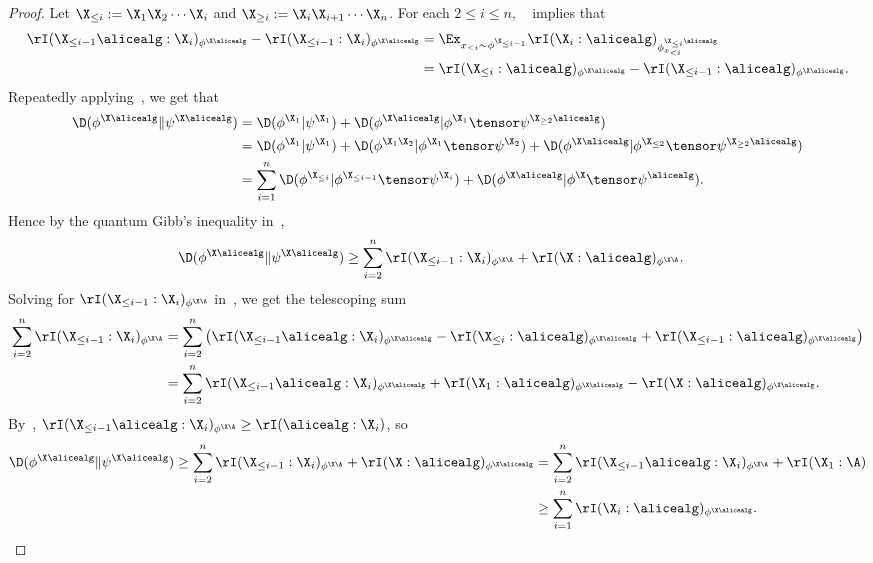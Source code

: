 \begin{proof}
	Let $\X_{\leq i} := \X_{1} \X_{2} \cdots \X_{i}$ and $\X_{\geq i} := \X_{i} \X_{i+1} \cdots \X_{n}$. For each $2 \leq i \leq n$, ~ implies that 
	\begin{align}
		\nonumber \rI(\X_{\leq i-1} \alicealg: \X_i)_{\phi^{\X \alicealg}} - \rI(\X_{ \leq i-1}: \X_i)_{\phi^{\X \alicealg}} &=  \Ex_{x_{<i} \sim \phi^{\X_{\leq i-1}}}  \rI( \X_i :\alicealg)_{\phi_{x_{<i}}^{\X_{\leq i}\alicealg}} \\
		\label{eq:raz_1a} &= \rI(\X_{\leq i} : \alicealg)_{\phi^{\X \alicealg}} - \rI(\X_{\leq i-1} : \alicealg)_{\phi^{\X \alicealg}}. 
	\end{align} 
	Repeatedly applying~, we get that
	\begin{align*}
		\D(\phi^{\X \alicealg} \| \psi^{\X \alicealg}) &= \D(\phi^{\X_1}|\psi^{\X_1}) + \D(\phi^{\X \alicealg} |\phi^{\X_1}  \tensor \psi^{ \X_{\geq 2} \alicealg}) \\
		&=\D(\phi^{\X_1}|\psi^{\X_1}) + \D(\phi^{\X_1 \X_2}|\phi^{\X_1} \tensor \psi^{\X_2} ) 
		+ \D(\phi^{\X \alicealg} |\phi^{\X_{\leq 2}}  \tensor \psi^{ \X_{\geq 2} \alicealg}) \\
		&= \sum_{i=1}^n \D(\phi^{\X_{\leq i}}|\phi^{\X_{\leq i-1}} \tensor \psi^{\X_i}) + \D(\phi^{\X \alicealg} |\phi^{\X} \tensor \psi^{\alicealg}). 
	\end{align*}
	Hence by the quantum Gibb's inequality in~, 
	\begin{align*}
		\D(\phi^{\X \alicealg} \| \psi^{\X \alicealg}) &\geq \sum_{i=2}^{n} \rI(\X_{\leq i -1 } : \X_{i})_{\phi^{\X \A}} +  \rI(\X: \alicealg)_{\phi^{\X \A}}.       \end{align*}
	Solving for $\rI(\X_{\leq i -1 } : \X_{i})_{\phi^{\X \A}}$ in~, we get the telescoping sum
	\begin{align*}
		\sum_{i=2}^{n} \rI(\X_{\leq i -1 } : \X_{i})_{\phi^{\X \A}} & =  
		\sum_{i=2}^{n} \left(\rI(\X_{\leq i-1} \alicealg: \X_i)_{\phi^{\X \alicealg}} - \rI(\X_{\leq i} : \alicealg)_{\phi^{\X \alicealg}} + \rI(\X_{\leq i-1} : \alicealg)_{\phi^{\X \alicealg}} \right)  \\
		&= \sum_{i=2}^{n} \rI(\X_{\leq i-1} \alicealg: \X_i)_{\phi^{\X \alicealg}} + \rI(\X_1 : \alicealg)_{\phi^{\X \alicealg}} - \rI(\X : \alicealg)_{\phi^{\X \alicealg}}.
	\end{align*}
	By~, $\rI(\X_{\leq i -1} \alicealg : \X_{ i})_{\phi^{\X \A}} \geq \rI(\alicealg : \X_{i})$, so 
	\begin{align*}
		\D(\phi^{\X \alicealg} \| \psi^{\X \alicealg}) \geq \sum_{i=2}^{n} \rI(\X_{\leq i -1 } : \X_{i})_{\phi^{\X \A}} + \rI(\X : \alicealg)_{\phi^{\X \alicealg}} & = \sum_{i=2}^{n} \rI(\X_{\leq i -1} \alicealg : \X_{ i})_{\phi^{\X \A}} + \rI(\X_1 : \A) \\ 
		& \geq \sum_{i=1}^{n} \rI(\X_i : \alicealg)_{\phi^{\X \alicealg}}.
	\end{align*}

\end{proof}
